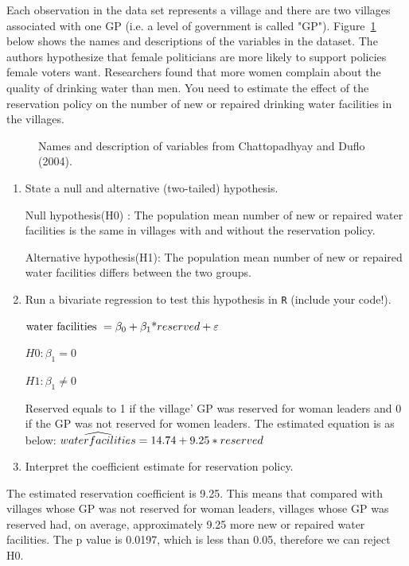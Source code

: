 \documentclass[12pt,letterpaper]{article}
\begin{document}
\noindent Each observation in the data set represents a village and there are two villages associated with one GP (i.e. a level of government is called "GP"). Figure~\ref{fig:women_desc} below shows the names and descriptions of the variables in the dataset. The authors hypothesize that female politicians are more likely to support policies female voters want. Researchers found that more women complain about the quality of drinking water than men. You need to estimate the effect of the reservation policy on the number of new or repaired drinking water facilities in the villages.
\vspace{.5cm}
\begin{figure}[h!]
	\caption{\footnotesize{Names and description of variables from Chattopadhyay and Duflo (2004).}}
	\vspace{.5cm}
	\centering
	\label{fig:women_desc}

\end{figure}		

\newpage
\begin{enumerate}
	\item [(a)] State a null and alternative (two-tailed) hypothesis. 
	\vspace{.5cm}
	
	Null hypothesis(H0) : The population mean number of new or repaired water facilities is the same in villages with and without the reservation policy.
	
	Alternative hypothesis(H1): The population mean number of new or repaired water facilities differs between the two groups.
	
	\vspace{6cm}
	\item [(b)] Run a bivariate regression to test this hypothesis in \texttt{R} (include your code!).
	
	
	 
	
	$ \text {water facilities } = \beta_0 + \beta_1 \text* reserved + \varepsilon $
	
	 $ H0 : \beta_1 = 0 $
	
	$ H1 : \beta_1 \neq  0 $
	
	Reserved equals to 1 if the village' GP was reserved for woman leaders and 0 if the GP was not reserved for women leaders. The estimated equation is as below:
	  $  \widehat{water facilities } = \text 14.74 + 9.25* reserved  $
	
	\vspace{6cm}
	\item [(c)] Interpret the coefficient estimate for reservation policy. 
\end{enumerate}
  
   The estimated reservation coefficient is 9.25. This means that compared  with villages whose GP was not reserved for woman leaders, villages whose GP was reserved had, on average, approximately 9.25 more new or repaired water facilities. The p value is 0.0197, which is less than 0.05, therefore we can reject H0.


\end{document}
